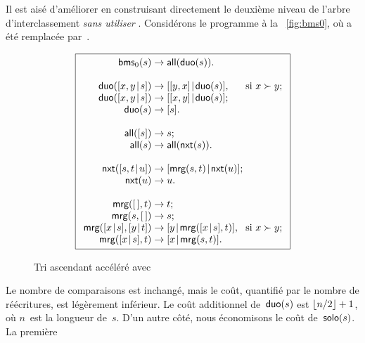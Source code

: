Il est aisé d'améliorer  en construisant directement le
deuxième niveau de l'arbre d'interclassement \emph{sans utiliser }.
 Considérons le programme à la
\fig~\vref{fig:bms0}, où  a
été remplacée par~.
\begin{figure}[!b]
\begin{equation*}
\boxed{%
\begin{array}{r@{\;}l@{\;}l@{\;}l}
\fun{bms}_0(s)   & \rightarrow & \fun{all}(\fun{duo}(s)).\\
\\
\fun{duo}(\cons{x,y}{s}) & \rightarrow & \cons{[y,x]}{\fun{duo}(s)},
                                       & \text{si \(x \succ y\)};\\
\fun{duo}(\cons{x,y}{s}) & \rightarrow & \cons{[x,y]}{\fun{duo}(s)};\\
\fun{duo}(s)             & \rightarrow & [s].\\
\\
\fun{all}([s]) & \rightarrow & s;\\
\fun{all}(s)   & \rightarrow & \fun{all}(\fun{nxt}(s)).\\
\\
\fun{nxt}(\cons{s,t}{u}) & \rightarrow
                         & \cons{\fun{mrg}(s,t)}{\fun{nxt}(u)};\\
\fun{nxt}(u)             & \rightarrow & u.\\
\\
\fun{mrg}(\el,t)         & \rightarrow & t;\\
\fun{mrg}(s,\el)         & \rightarrow & s;\\
\fun{mrg}(\cons{x}{s},\cons{y}{t}) & \rightarrow
                         & \cons{y}{\fun{mrg}(\cons{x}{s},t)},
                         & \text{si \(x \succ y\)};\\
\fun{mrg}(\cons{x}{s},t) & \rightarrow & \cons{x}{\fun{mrg}(s,t)}.
\end{array}}
\end{equation*}
\caption{Tri ascendant accéléré avec }
\label{fig:bms0}
\end{figure}
Le nombre de comparaisons est inchangé, mais le coût, quantifié par le
nombre de réécritures, est légèrement inférieur. Le coût additionnel
de~\(\textsf{duo}(s)\) est \(\lfloor{n/2}\rfloor+1\), où
\(n\)~est la longueur de~\(s\). D'un autre côté, nous économisons le
coût de~\(\textsf{solo}(s)\). La première
